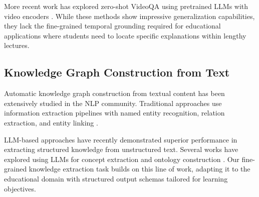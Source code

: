 More recent work has explored zero-shot VideoQA using pretrained LLMs with video encoders \cite{li2023zero}. While these methods show impressive generalization capabilities, they lack the fine-grained temporal grounding required for educational applications where students need to locate specific explanations within lengthy lectures.

\subsection{Knowledge Graph Construction from Text}

Automatic knowledge graph construction from textual content has been extensively studied in the NLP community. Traditional approaches use information extraction pipelines with named entity recognition, relation extraction, and entity linking \cite{hoffmann2011knowledge}. 

LLM-based approaches have recently demonstrated superior performance in extracting structured knowledge from unstructured text. Several works have explored using LLMs for concept extraction \cite{gutierrez2023llm} and ontology construction \cite{pan2023ontology}. Our fine-grained knowledge extraction task builds on this line of work, adapting it to the educational domain with structured output schemas tailored for learning objectives.
